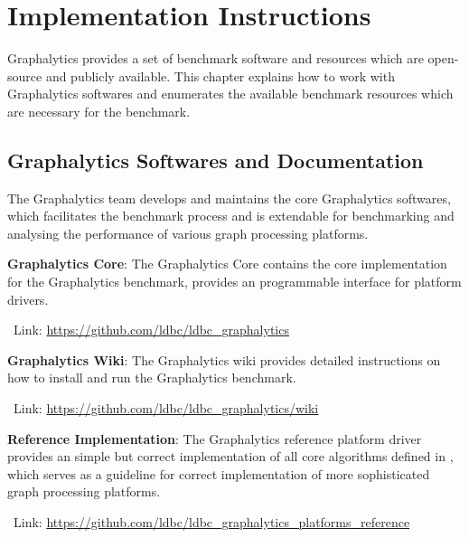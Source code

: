 \chapter{Implementation Instructions}
\label{chap:instructions}
Graphalytics provides a set of benchmark software and resources which are open-source and publicly available. This chapter explains how to work with Graphalytics softwares and enumerates the available benchmark resources which are necessary for the benchmark.



\section{Graphalytics Softwares and Documentation}\label{sec:instructions:core}
The Graphalytics team develops and maintains the core Graphalytics softwares, which facilitates the benchmark process and is extendable for benchmarking and analysing the performance of various graph processing platforms.

\textbf{Graphalytics Core}: The Graphalytics Core contains the core implementation for the Graphalytics benchmark, provides an programmable interface for platform drivers.

\-\ Link: \url{https://github.com/ldbc/ldbc_graphalytics}


\textbf{Graphalytics Wiki}: The Graphalytics wiki provides detailed instructions on how to install and run the Graphalytics benchmark.

\-\ Link: \url{https://github.com/ldbc/ldbc_graphalytics/wiki}




\textbf{Reference Implementation}: The Graphalytics reference platform driver provides an simple but correct implementation of all core algorithms defined in , which serves as a guideline for correct implementation of more sophisticated graph processing platforms.

\-\ Link: \url{https://github.com/ldbc/ldbc_graphalytics_platforms_reference}









